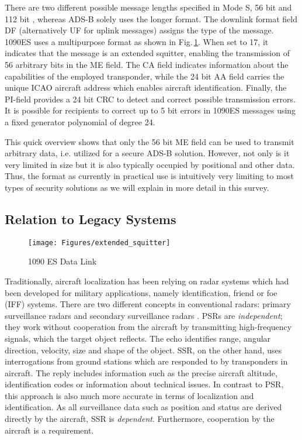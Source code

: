 \documentclass[english]{IEEEtran}
\begin{document}
There are two different possible message lengths specified in Mode
S, 56 bit and 112 bit \cite{DO2422}, whereas ADS-B solely uses the
longer format. The downlink format field DF (alternatively UF for
uplink messages) assigns the type of the message.\emph{ }1090ES uses
a multipurpose format as shown in Fig.\,\ref{fig:1090-ES-Data}.
When set to 17, it indicates that the message is an extended squitter,
enabling the transmission of 56 arbitrary bits in the ME field.\emph{
}The CA field indicates information about the capabilities of the
employed transponder, while the\emph{ }24 bit AA field carries the
unique ICAO aircraft address which enables aircraft identification.\emph{
}Finally, the PI-field provides a 24 bit CRC to detect and correct
possible transmission errors.\emph{ }It is possible for recipients
to correct up to 5 bit errors in 1090ES messages using a fixed generator
polynomial of degree 24.

This quick overview shows that only the 56 bit ME field can be used
to transmit arbitrary data, i.e. utilized for a secure ADS-B solution.
However, not only is it very limited in size but it is also typically
occupied by positional and other data. Thus, the format as currently
in practical use is intuitively very limiting to most types of security
solutions as we will explain in more detail in this survey.


\subsection*{Relation to Legacy Systems}

\begin{figure}
\texttt{[image: Figures/extended\_squitter]}

\caption{1090 ES Data Link \cite{schafer2013experimental}\label{fig:1090-ES-Data}}
\end{figure}
Traditionally, aircraft localization has been relying on radar systems
which had been developed for military applications, namely identification,
friend or foe (IFF) systems. There are two different concepts in conventional
radars: primary surveillance radars and secondary surveillance radars
\cite{Skolnik07}. PSRs are \textit{independent}; they work without
cooperation from the aircraft by transmitting high-frequency signals,
which the target object reflects. The echo identifies range, angular
direction, velocity, size and shape of the object. SSR, on the other
hand, uses interrogations from ground stations which are responded
to by transponders in aircraft. The reply includes information such
as the precise aircraft altitude, identification codes or information
about technical issues. In contrast to PSR, this approach is also
much more accurate in terms of localization and identification. As
all surveillance data such as position and status are derived directly
by the aircraft, SSR is \textit{dependent}. Furthermore, cooperation
by the aircraft is a requirement.
\end{document}
